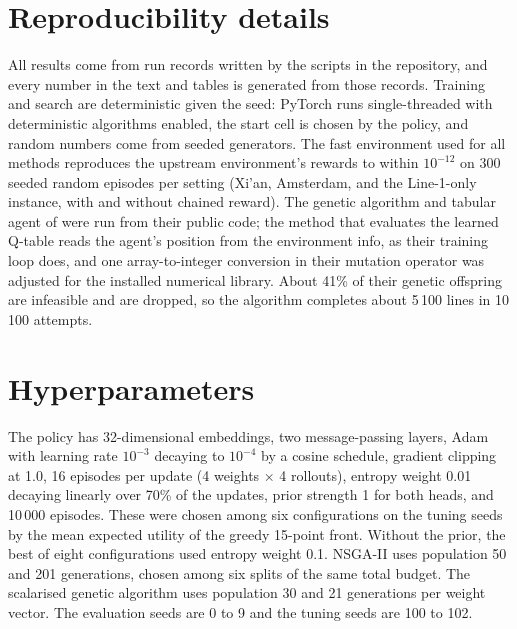 \section{Reproducibility details}\label{app:repro}
All results come from run records written by the scripts in the repository, and every number in the text and tables is generated from those records. Training and search are deterministic given the seed: PyTorch runs single-threaded with deterministic algorithms enabled, the start cell is chosen by the policy, and random numbers come from seeded generators. The fast environment used for all methods reproduces the upstream environment's rewards to within $10^{-12}$ on 300 seeded random episodes per setting (Xi'an, Amsterdam, and the Line-1-only instance, with and without chained reward). The genetic algorithm and tabular agent of \citet{michailidis2026} were run from their public code; the method that evaluates the learned Q-table reads the agent's position from the environment info, as their training loop does, and one array-to-integer conversion in their mutation operator was adjusted for the installed numerical library. About 41\% of their genetic offspring are infeasible and are dropped, so the algorithm completes about 5\,100 lines in 10\,100 attempts.

\section{Hyperparameters}\label{app:hyper}
The policy has 32-dimensional embeddings, two message-passing layers, Adam with learning rate $10^{-3}$ decaying to $10^{-4}$ by a cosine schedule, gradient clipping at 1.0, 16 episodes per update (4 weights $\times$ 4 rollouts), entropy weight 0.01 decaying linearly over 70\% of the updates, prior strength 1 for both heads, and 10\,000 episodes. These were chosen among six configurations on the tuning seeds by the mean expected utility of the greedy 15-point front. Without the prior, the best of eight configurations used entropy weight 0.1. NSGA-II uses population 50 and 201 generations, chosen among six splits of the same total budget. The scalarised genetic algorithm uses population 30 and 21 generations per weight vector. The evaluation seeds are 0 to 9 and the tuning seeds are 100 to 102.
